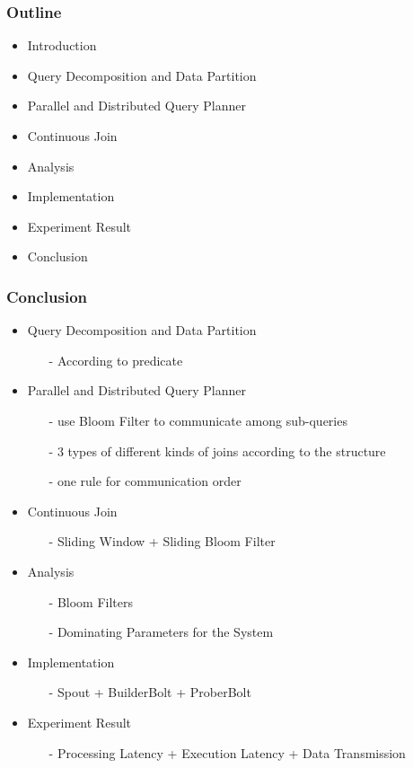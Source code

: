 \begin{frame}
\frametitle{Outline}
	\begin{itemize}
		\item Introduction
		\item Query Decomposition and Data Partition
		\item Parallel and Distributed Query Planner
		\item Continuous Join
		\item Analysis
		\item Implementation
		\item Experiment Result
		\item Conclusion
	\end{itemize}
\end{frame}


\begin{frame}
\frametitle{Conclusion}
\vspace{-0.1in}
	\begin{itemize}
		\item Query Decomposition and Data Partition
		\begin{itemize}
		\item[-] According to predicate
		\end{itemize}
		\item Parallel and Distributed Query Planner
		\begin{itemize}
		\item[-] use Bloom Filter to communicate among sub-queries
		\item[-] 3 types of different kinds of joins according to the structure
		\item[-] one rule for communication order
		\end{itemize}
		\item Continuous Join
		\begin{itemize}
		\item[-] Sliding Window + Sliding Bloom Filter
		\end{itemize}
		\item Analysis
		\begin{itemize}
		\item[-] Bloom Filters
		\item[-] Dominating Parameters for the System
		\end{itemize}
		\item Implementation
		\begin{itemize}
		\item[-] Spout + BuilderBolt + ProberBolt
		\end{itemize}
		\item Experiment Result
		\begin{itemize}
		\item[-] Processing Latency + Execution Latency + Data Transmission
		\end{itemize}
	\end{itemize}
\end{frame}
